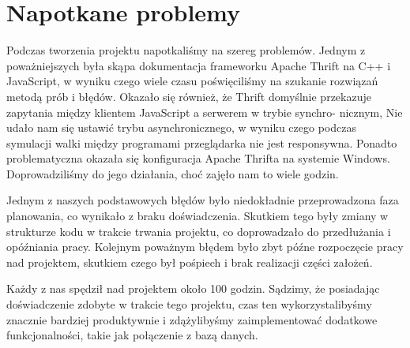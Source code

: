 \chapter{Napotkane problemy}
Podczas tworzenia projektu napotkaliśmy na szereg problemów. Jednym z poważniejszych
była skąpa dokumentacja frameworku Apache Thrift na C++ i JavaScript, w wyniku czego
wiele czasu poświęciliśmy na szukanie rozwiązań metodą prób i błędów. Okazało się również, że
Thrift domyślnie przekazuje zapytania między klientem JavaScript a serwerem w trybie synchro-
nicznym, Nie udało nam się ustawić trybu asynchronicznego, w wyniku czego podczas symulacji
walki między programami przeglądarka nie jest responsywna. Ponadto problematyczna okazała
się konfiguracja Apache Thrifta na systemie Windows. Doprowadziliśmy do jego działania, choć
zajęło nam to wiele godzin.

Jednym z naszych podstawowych błędów było niedokładnie przeprowadzona faza planowania, co wynikało z braku doświadczenia. Skutkiem tego były zmiany w strukturze kodu w trakcie trwania projektu, co doprowadzało do przedłużania i opóźniania pracy. Kolejnym poważnym błędem było zbyt późne rozpoczęcie pracy nad projektem, skutkiem czego był pośpiech i brak realizacji części założeń.

Każdy z nas spędził nad projektem około 100 godzin. Sądzimy, że posiadając doświadczenie zdobyte w trakcie tego projektu, czas ten wykorzystalibyśmy znacznie bardziej produktywnie i zdążylibyśmy zaimplementować dodatkowe funkcjonalności, takie jak połączenie z bazą danych.